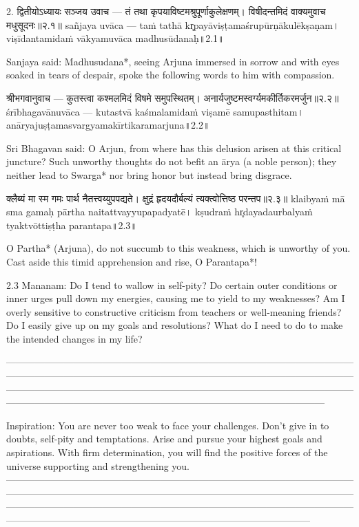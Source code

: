2. द्वितीयोऽध्यायः
सञ्जय उवाच —
तं तथा कृपयाविष्टमश्रुपूर्णाकुलेक्षणम्।
 विषीदन्तमिदं वाक्यमुवाच मधुसूदनः॥२.१॥
sañjaya uvāca —
taṁ tathā kr̥payāviṣṭamaśrupūrṇākulēkṣaṇam।
viṣīdantamidaṁ vākyamuvāca madhusūdanaḥ॥2.1॥

Sanjaya said:
Madhusudana*, seeing Arjuna immersed in sorrow and with eyes soaked in tears of despair, spoke the following words to him with compassion.


श्रीभगवानुवाच —
कुतस्त्वा कश्मलमिदं विषमे समुपस्थितम्।
 अनार्यजुष्टमस्वर्ग्यमकीर्तिकरमर्जुन॥२.२॥
śrībhagavānuvāca —
kutastvā kaśmalamidaṁ viṣamē samupasthitam।
anāryajuṣṭamasvargyamakīrtikaramarjuna॥2.2॥

Sri Bhagavan said:
O Arjun, from where has this delusion arisen at this critical juncture? Such unworthy thoughts do not befit an ārya (a noble person); they neither lead to Swarga* nor bring honor but instead bring disgrace.


क्लैब्यं मा स्म गमः पार्थ नैतत्त्वय्युपपद्यते।
 क्षुद्रं हृदयदौर्बल्यं त्यक्त्वोत्तिष्ठ परन्तप॥२.३॥
klaibyaṁ mā sma gamaḥ pārtha naitattvayyupapadyatē।
kṣudraṁ hr̥dayadaurbalyaṁ tyaktvōttiṣṭha parantapa॥2.3॥

O Partha* (Arjuna), do not succumb to this weakness, which is unworthy of you. Cast aside this timid apprehension and rise, O Parantapa*!

2.3 Mananam: 
Do I tend to wallow in self-pity? Do certain outer conditions or inner urges pull down my energies, causing me to yield to my weaknesses? Am I overly sensitive to constructive criticism from teachers or well-meaning friends?
Do I easily give up on my goals and resolutions? What do I need to do to make the intended changes in my life? 

---------------------------------------------------------------------------------------------------------------------------------------------------------------------------------------------------------------------------------------------------------------------------------------------------------------------------------------------------------------------------------------------------------------------------------------

Inspiration: 
You are never too weak to face your challenges. Don’t give in to doubts, self-pity and temptations. Arise and pursue your highest goals and aspirations. With firm determination, you will find the positive forces of the universe supporting and strengthening you.
—--------------------------------------------------------------------------------------------------------------------------------------------------------------------------------------------------------------------------------------------------------------------------------------------------------------------------------------------------------------------------------------------------------------------------------


